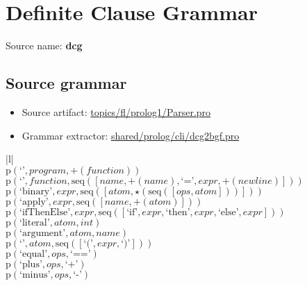 \chapter{Definite Clause Grammar}

 Source name: \textbf{dcg}

\section{Source grammar}

\begin{itemize}
\item Source artifact: \href{http://github.com/grammarware/slps/blob/master/topics/fl/prolog1/Parser.pro}{topics/fl/prolog1/Parser.pro}
\item Grammar extractor: \href{http://github.com/grammarware/slps/blob/master/shared/prolog/cli/dcg2bgf.pro}{shared/prolog/cli/dcg2bgf.pro}
\end{itemize}

\footnotesize\begin{center}\begin{tabular}{|l|}\hline
{}
\\\hline
$\mathrm{p}(\text{`'},\mathit{program},\plus \left(\mathit{function}\right))$	\\
$\mathrm{p}(\text{`'},\mathit{function},\mathrm{seq}\left(\left[\mathit{name}, \plus \left(\mathit{name}\right), \text{`='}, \mathit{expr}, \plus \left(\mathit{newline}\right)\right]\right))$	\\
$\mathrm{p}(\text{`binary'},\mathit{expr},\mathrm{seq}\left(\left[\mathit{atom}, \star \left(\mathrm{seq}\left(\left[\mathit{ops}, \mathit{atom}\right]\right)\right)\right]\right))$	\\
$\mathrm{p}(\text{`apply'},\mathit{expr},\mathrm{seq}\left(\left[\mathit{name}, \plus \left(\mathit{atom}\right)\right]\right))$	\\
$\mathrm{p}(\text{`ifThenElse'},\mathit{expr},\mathrm{seq}\left(\left[\text{`if'}, \mathit{expr}, \text{`then'}, \mathit{expr}, \text{`else'}, \mathit{expr}\right]\right))$	\\
$\mathrm{p}(\text{`literal'},\mathit{atom},\mathit{int})$	\\
$\mathrm{p}(\text{`argument'},\mathit{atom},\mathit{name})$	\\
$\mathrm{p}(\text{`'},\mathit{atom},\mathrm{seq}\left(\left[\text{`('}, \mathit{expr}, \text{`)'}\right]\right))$	\\
$\mathrm{p}(\text{`equal'},\mathit{ops},\text{`=='})$	\\
$\mathrm{p}(\text{`plus'},\mathit{ops},\text{`+'})$	\\
$\mathrm{p}(\text{`minus'},\mathit{ops},\text{`-'})$	\\
\hline\end{tabular}\end{center}

